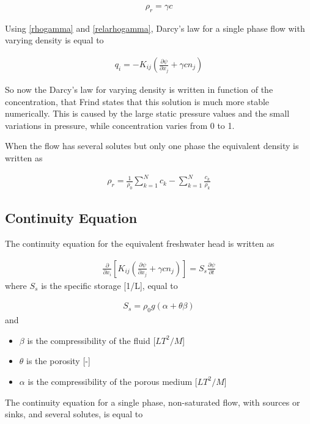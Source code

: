 \documentclass[11pt,twoside]{report}
\begin{document}
\begin{align}\label{relarhogamma}
   \rho_{r} = \gamma c
\end{align}

Using \eqref{rhogamma} and \eqref{relarhogamma}, Darcy's law for a single phase flow with varying density is equal to

\begin{align}
   q_{i} = -K_{ij}\left(\frac{\partial \psi}{\partial x_{j}} + \gamma c n_{j} \right)
\end{align}

So now the Darcy's law for varying density is written in function of the concentration, that Frind 
\cite{frind1982} states that this solution is much more stable numerically. This is caused by the large static pressure values and the small variations in pressure, while concentration varies from 0 to 1. 

When the flow has several solutes but only one phase the equivalent density is written as

\begin{align}
   \rho_{r} = \frac{1}{\rho_{0}}\sum_{k=1}^{N}c_{k} - \sum_{k=1}^{N}\frac{c_{k}}{\rho_{k}}
\end{align}

\subsection{Continuity Equation}
The continuity equation for the equivalent freshwater head is written as

\begin{align}
   \frac{\partial}{\partial x_{i}}\left[ K_{ij}\left(\frac{\partial \psi}{\partial x_{j}} + \gamma c n_{j} \right)\right] = S_{s}\frac{\partial \psi}{\partial t}
\end{align}
where $S_{s}$ is the specific storage [1/L], equal to 

\begin{align}
   S_{s} = \rho_{0}g(\alpha + \theta \beta)
\end{align}
and
\begin{itemize}
   \item $\beta$ is the compressibility of the fluid [$LT^{2}/M$]
   \item $\theta$ is the porosity [-]
   \item $\alpha$ is the compressibility of the porous medium [$LT^{2}/M$]
\end{itemize}

The continuity equation for a single phase, non-saturated flow, with sources or sinks, and several solutes, is equal to
\end{document}
